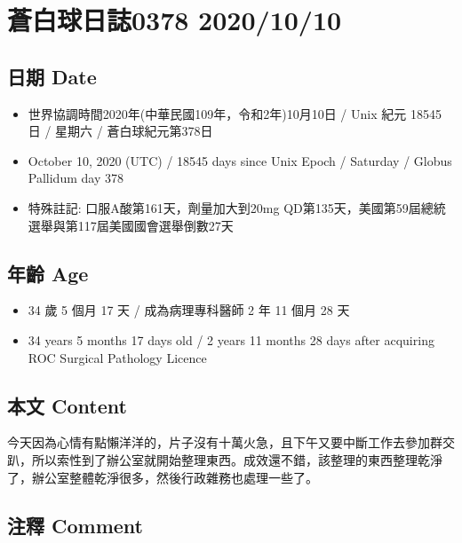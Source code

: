 \documentclass[
]{article}
\providecommand{\tightlist}{%
  \setlength{\itemsep}{0pt}\setlength{\parskip}{0pt}}
\begin{document}
\hypertarget{ux84bcux767dux7403ux65e5ux8a8c0378-20201010}{%
\section{蒼白球日誌0378
2020/10/10}\label{ux84bcux767dux7403ux65e5ux8a8c0378-20201010}}

\hypertarget{ux65e5ux671f-date-37}{%
\subsection{日期 Date}\label{ux65e5ux671f-date-37}}

\begin{itemize}
\tightlist
\item
  世界協調時間2020年(中華民國109年，令和2年)10月10日 / Unix 紀元 18545
  日 / 星期六 / 蒼白球紀元第378日
\item
  October 10, 2020 (UTC) / 18545 days since Unix Epoch / Saturday /
  Globus Pallidum day 378
\item
  特殊註記: 口服A酸第161天，劑量加大到20mg
  QD第135天，美國第59屆總統選舉與第117屆美國國會選舉倒數27天
\end{itemize}

\hypertarget{ux5e74ux9f61-age-37}{%
\subsection{年齡 Age}\label{ux5e74ux9f61-age-37}}

\begin{itemize}
\tightlist
\item
  34 歲 5 個月 17 天 / 成為病理專科醫師 2 年 11 個月 28 天
\item
  34 years 5 months 17 days old / 2 years 11 months 28 days after
  acquiring ROC Surgical Pathology Licence
\end{itemize}

\hypertarget{ux672cux6587-content-37}{%
\subsection{本文 Content}\label{ux672cux6587-content-37}}

今天因為心情有點懶洋洋的，片子沒有十萬火急，且下午又要中斷工作去參加群交趴，所以索性到了辦公室就開始整理東西。成效還不錯，該整理的東西整理乾淨了，辦公室整體乾淨很多，然後行政雜務也處理一些了。

\hypertarget{ux6ce8ux91cb-comment-37}{%
\subsection{注釋 Comment}\label{ux6ce8ux91cb-comment-37}}
\end{document}
